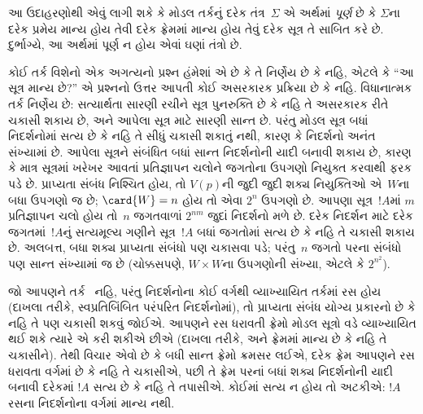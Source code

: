 આ ઉદાહરણોથી એવું લાગી શકે કે મોડલ તર્કનું દરેક તંત્ર~$\Sigma$
એ અર્થમાં \emph{પૂર્ણ} છે કે $\Sigma$ના દરેક પ્રમેય માન્ય હોય તેવી
દરેક ફ્રેમમાં માન્ય હોય તેવું દરેક સૂત્ર તે સાબિત કરે છે.
દુર્ભાગ્યે, આ અર્થમાં પૂર્ણ ન હોય એવાં ઘણાં તંત્રો છે.
\endgroup


\OLEndChapterHook
\endgroup


\begingroup
\makeatletter{}\makeatother

\label{guunit:OLP-0450}


\begingroup
\makeatletter{}\makeatother


\label{guunit:OLP-0451}


કોઈ તર્ક વિશેનો એક અગત્યનો પ્રશ્ન હંમેશાં એ છે કે તે નિર્ણેય છે કે
નહિ, એટલે કે ``આ સૂત્ર માન્ય છે?'' એ પ્રશ્નનો ઉત્તર આપતી
કોઈ અસરકારક પ્રક્રિયા છે કે નહિ. વિધાનાત્મક તર્ક નિર્ણેય છે:
સત્યાર્થતા સારણી રચીને સૂત્ર પુનરુક્તિ છે કે નહિ તે
અસરકારક રીતે ચકાસી શકાય છે, અને આપેલા સૂત્ર માટે સારણી
સાન્ત છે. પરંતુ મોડલ સૂત્ર બધાં નિદર્શનોમાં સત્ય છે કે નહિ તે સીધું
ચકાસી શકાતું નથી, કારણ કે નિદર્શનો અનંત સંખ્યામાં છે. આપેલા સૂત્રને
સંબંધિત બધાં સાન્ત નિદર્શનોની યાદી બનાવી શકાય છે, કારણ કે માત્ર
સૂત્રમાં ખરેખર આવતાં પ્રતિજ્ઞાપન ચલોને જગતોના
ઉપગણો નિયુક્ત કરવાથી ફરક પડે છે. પ્રાપ્યતા સંબંધ નિશ્ચિત હોય, તો
$V(p)$ની જુદી જુદી શક્ય નિયુક્તિઓ એ~$W$ના બધા ઉપગણો જ છે;
$\card{W} = n$ હોય તો એવા $2^n$ ઉપગણો છે. આપણા
સૂત્ર~$!A$માં $m$ પ્રતિજ્ઞાપન ચલો હોય તો~$n$ જગતવાળાં $2^{nm}$ જુદાં નિદર્શનો મળે છે.
દરેક નિદર્શન માટે દરેક જગતમાં~$!A$નું સત્યમૂલ્ય ગણીને સૂત્ર~$!A$
બધાં જગતોમાં સત્ય છે કે નહિ તે ચકાસી શકાય છે. અલબત્ત, બધા શક્ય
પ્રાપ્યતા સંબંધો પણ ચકાસવા પડે; પરંતુ~$n$ જગતો પરના સંબંધો પણ
સાન્ત સંખ્યામાં જ છે (ચોક્કસપણે, $W \times W$ના ઉપગણોની સંખ્યા,
એટલે કે $2^{n^2}$).

જો આપણને તર્ક~ નહિ, પરંતુ નિદર્શનોના કોઈ વર્ગથી
વ્યાખ્યાયિત તર્કમાં રસ હોય (દાખલા તરીકે, સ્વપ્રતિબિંબિત પરંપરિત
નિદર્શનોમાં), તો પ્રાપ્યતા સંબંધ યોગ્ય પ્રકારનો છે કે નહિ તે પણ
ચકાસી શકવું જોઈએ. આપણને રસ ધરાવતી ફ્રેમો મોડલ સૂત્રો વડે
વ્યાખ્યાયિત થઈ શકે ત્યારે એ કરી શકીએ છીએ (દાખલા તરીકે,
 અને  ફ્રેમમાં માન્ય છે કે નહિ તે ચકાસીને). તેથી વિચાર
એવો છે કે બધી સાન્ત ફ્રેમો ક્રમસર લઈએ, દરેક ફ્રેમ આપણને રસ ધરાવતા
વર્ગમાં છે કે નહિ તે ચકાસીએ, પછી તે ફ્રેમ પરનાં બધાં શક્ય
નિદર્શનોની યાદી બનાવી દરેકમાં $!A$ સત્ય છે કે નહિ તે તપાસીએ.
કોઈમાં સત્ય ન હોય તો અટકીએ: $!A$ રસના નિદર્શનોના વર્ગમાં માન્ય
નથી.

